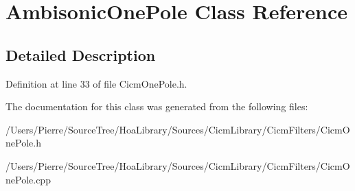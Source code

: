 \hypertarget{class_ambisonic_one_pole}{\section{Ambisonic\-One\-Pole Class Reference}
\label{class_ambisonic_one_pole}
}


\subsection{Detailed Description}


Definition at line 33 of file Cicm\-One\-Pole.\-h.



The documentation for this class was generated from the following files\-:\begin{DoxyCompactItemize}
\item 
/\-Users/\-Pierre/\-Source\-Tree/\-Hoa\-Library/\-Sources/\-Cicm\-Library/\-Cicm\-Filters/Cicm\-One\-Pole.\-h\item 
/\-Users/\-Pierre/\-Source\-Tree/\-Hoa\-Library/\-Sources/\-Cicm\-Library/\-Cicm\-Filters/Cicm\-One\-Pole.\-cpp\end{DoxyCompactItemize}
